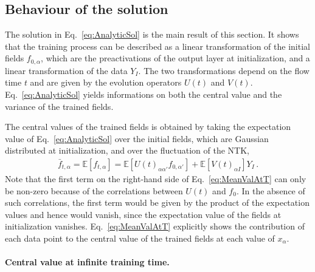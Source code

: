 \documentclass[11pt]{article}
\begin{document}
\subsection{Behaviour of the solution}
\label{sec:BehaviourOfSolution}
The solution in Eq.~\eqref{eq:AnalyticSol} is the main result of this section. It shows that the
training process can be described as a linear transformation of the initial fields $f_{0,\alpha}$,
which are the preactivations of the output layer at initialization, and a linear transformation
of the data $Y_I$. The two transformations depend on the flow time $t$ and are given by the evolution
operators $U(t)$ and $V(t)$. Eq.~\eqref{eq:AnalyticSol} yields informations on both the central value
and the variance of the trained fields.

The central values of the trained fields is obtained by taking the expectation value of
Eq.~\eqref{eq:AnalyticSol} over the initial fields, which are Gaussian distributed at initialization, and over the
fluctuation of the NTK,
\begin{align}
    \label{eq:MeanValAtT}
    \bar{f}_{t,\alpha} = \mathbb{E}\left[f_{t,\alpha}\right]
        = \mathbb{E}\left[U(t)_{\alpha\alpha'} f_{0,\alpha'}\right]
            + \mathbb{E}\left[V(t)_{\alpha I}\right] Y_I \, .
\end{align}
Note that the first term on the right-hand side of Eq.~\eqref{eq:MeanValAtT} can only be non-zero because of the
correlations between $U(t)$ and $f_0$. In the absence of such correlations, the first term would be given by the product
of the expectation values and hence would vanish, since the expectation value of the fields at initialization vanishes.
Eq.~\eqref{eq:MeanValAtT} explicitly shows the contribution of each data point to the central value of the
trained fields at each value of $x_{\alpha}$.

\paragraph{Central value at infinite training time.}
\end{document}
